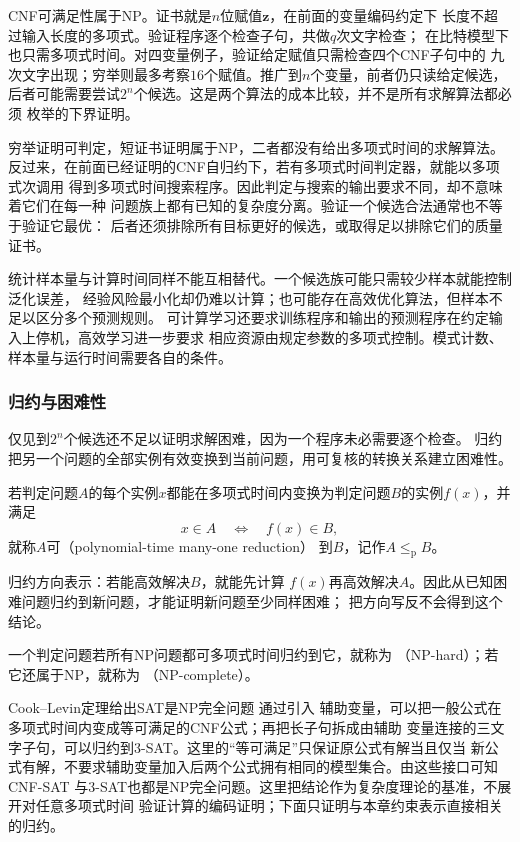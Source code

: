 CNF可满足性属于$\mathrm{NP}$。证书就是$n$位赋值$\bm z$，在前面的变量编码约定下
长度不超过输入长度的多项式。验证程序逐个检查子句，共做$q$次文字检查；
在比特模型下也只需多项式时间。对四变量例子，验证给定赋值只需检查四个CNF子句中的
九次文字出现；穷举则最多考察$16$个赋值。推广到$n$个变量，前者仍只读给定候选，
后者可能需要尝试$2^n$个候选。这是两个算法的成本比较，并不是所有求解算法都必须
枚举的下界证明。

穷举证明可判定，短证书证明属于NP，二者都没有给出多项式时间的求解算法。
反过来，在前面已经证明的CNF自归约下，若有多项式时间判定器，就能以多项式次调用
得到多项式时间搜索程序。因此判定与搜索的输出要求不同，却不意味着它们在每一种
问题族上都有已知的复杂度分离。验证一个候选合法通常也不等于验证它最优：
后者还须排除所有目标更好的候选，或取得足以排除它们的质量证书。

统计样本量与计算时间同样不能互相替代。一个候选族可能只需较少样本就能控制泛化误差，
经验风险最小化却仍难以计算；也可能存在高效优化算法，但样本不足以区分多个预测规则。
可计算学习还要求训练程序和输出的预测程序在约定输入上停机，高效学习进一步要求
相应资源由规定参数的多项式控制。模式计数、样本量与运行时间需要各自的条件。

\subsubsection{归约与困难性}
\label{sec:comb-reductions}

仅见到$2^n$个候选还不足以证明求解困难，因为一个程序未必需要逐个检查。
归约把另一个问题的全部实例有效变换到当前问题，用可复核的转换关系建立困难性。

\begin{definition}[多项式时间多对一归约]
\label{def:comb-polynomial-reduction}
若判定问题$A$的每个实例$x$都能在多项式时间内变换为判定问题$B$的实例$f(x)$，并满足
\[
  x\in A\quad\Longleftrightarrow\quad f(x)\in B,
\]
就称$A$可（polynomial-time many-one reduction）
到$B$，记作$A\leq_{\mathrm{p}}B$。
\end{definition}
归约方向表示：若能高效解决$B$，就能先计算
$f(x)$再高效解决$A$。因此从已知困难问题归约到新问题，才能证明新问题至少同样困难；
把方向写反不会得到这个结论。

\begin{definition}[NP困难与NP完全]
\label{def:comb-np-hard-complete}
一个判定问题若所有$\mathrm{NP}$问题都可多项式时间归约到它，就称为
（NP-hard）；若它还属于$\mathrm{NP}$，就称为
（NP-complete）。
\end{definition}
Cook--Levin定理给出SAT是NP完全问题
通过引入
辅助变量，可以把一般公式在多项式时间内变成等可满足的CNF公式；再把长子句拆成由辅助
变量连接的三文字子句，可以归约到3-SAT。这里的“等可满足”只保证原公式有解当且仅当
新公式有解，不要求辅助变量加入后两个公式拥有相同的模型集合。由这些接口可知CNF-SAT
与3-SAT也都是NP完全问题。这里把结论作为复杂度理论的基准，不展开对任意多项式时间
验证计算的编码证明；下面只证明与本章约束表示直接相关的归约。


